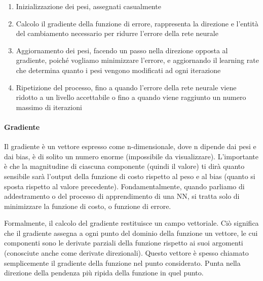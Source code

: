 \begin{enumerate}
    \item Inizializzazione dei pesi, assegnati casualmente
    \item Calcolo il gradiente della funzione di errore, rappresenta la direzione e l'entità del cambiamento necessario per ridurre l'errore della rete neurale
    \item Aggiornamento dei pesi, facendo un passo nella direzione opposta al gradiente, poiché vogliamo minimizzare l'errore, e aggiornando il learning rate che determina quanto i pesi vengono modificati ad ogni iterazione
    \item Ripetizione del processo, fino a quando l'errore della rete neurale viene ridotto a un livello accettabile o fino a quando viene raggiunto un numero massimo di iterazioni
\end{enumerate}

\paragraph{Gradiente} 
Il gradiente è un vettore espresso come n-dimensionale, dove n dipende dai pesi e dai bias, è di solito un numero enorme (impossibile da visualizzare). L'importante è che la magnitudine di ciascuna componente (quindi il valore) ti dirà quanto sensibile sarà l'output della funzione di costo rispetto al peso e al bias (quanto si sposta rispetto al valore precedente). Fondamentalmente, quando parliamo di addestramento o del processo di apprendimento di una NN, si tratta solo di minimizzare la funzione di costo, o funzione di errore.

Formalmente, il calcolo del gradiente restituisce un campo vettoriale. Ciò significa che il gradiente assegna a ogni punto del dominio della funzione un vettore, le cui componenti sono le derivate parziali della funzione rispetto ai suoi argomenti (conosciute anche come derivate direzionali). Questo vettore è spesso chiamato semplicemente il gradiente della funzione nel punto considerato. Punta nella direzione della pendenza più ripida della funzione in quel punto.

